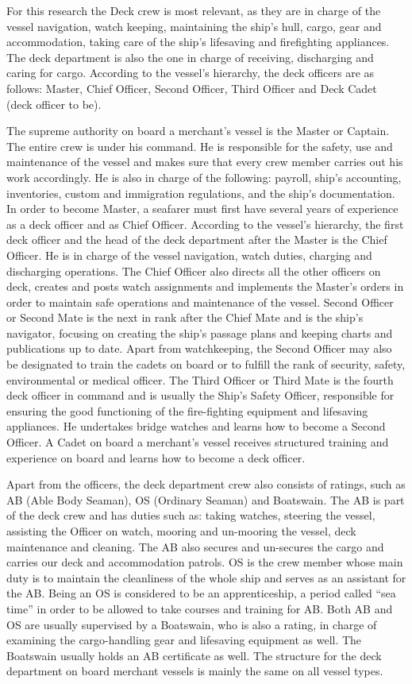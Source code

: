 For this research the Deck crew is most relevant, as they are in charge of the vessel navigation, watch keeping, maintaining the ship’s hull, cargo, gear and accommodation, taking care of the ship’s lifesaving and firefighting appliances. The deck department is also the one in charge of receiving, discharging and caring for cargo. According to the vessel’s hierarchy, the deck officers are as follows: Master, Chief Officer, Second Officer, Third Officer and Deck Cadet (deck officer to be).

The supreme authority on board a merchant's vessel is the Master or Captain. The entire crew is under his command. He is responsible for the safety, use and maintenance of the vessel and makes sure that every crew member carries out his work accordingly. He is also in charge of the following: payroll, ship’s accounting, inventories, custom and immigration regulations, and the ship’s documentation. In order to become Master, a seafarer must first have several years of experience as a deck officer and as Chief Officer.
According to the vessel’s hierarchy, the first deck officer and the head of the deck department after the Master is the Chief Officer. He is in charge of the vessel navigation, watch duties, charging and discharging operations. The Chief Officer also directs all the other officers on deck, creates and posts watch assignments and implements the Master’s orders in order to maintain safe operations and maintenance of the vessel.
Second Officer or Second Mate is the next in rank after the Chief Mate and is the ship’s navigator, focusing on creating the ship’s passage plans and keeping charts and publications up to date. Apart from watchkeeping, the Second Officer may also be designated to train the cadets on board or to fulfill the rank of security, safety, environmental or medical officer.
The Third Officer or Third Mate is the fourth deck officer in command and is usually the Ship’s Safety Officer, responsible for ensuring the good functioning of the fire-fighting equipment and lifesaving appliances. He undertakes bridge watches and learns how to become a Second Officer.
A Cadet on board a merchant's vessel receives structured training and experience on board and learns how to become a deck officer.

Apart from the officers, the deck department crew also consists of ratings, such as AB (Able Body Seaman), OS (Ordinary Seaman) and Boatswain.
The AB is part of the deck crew and has duties such as: taking watches, steering the vessel, assisting the Officer on watch, mooring and un-mooring the vessel, deck maintenance and cleaning. The AB also secures and un-secures the cargo and carries our deck and accommodation patrols.
OS is the crew member whose main duty is to maintain the cleanliness of the whole ship and serves as an assistant for the AB. Being an OS is considered to be an apprenticeship, a period called “sea time” in order to be allowed to take courses and training for AB.
Both AB and OS are usually supervised by a Boatswain, who is also a rating, in charge of examining the cargo-handling gear and lifesaving equipment as well. The Boatswain usually holds an AB certificate as well.
The structure for the deck department on board merchant vessels is mainly the same on all vessel types. \cite{Nedcon2013}

